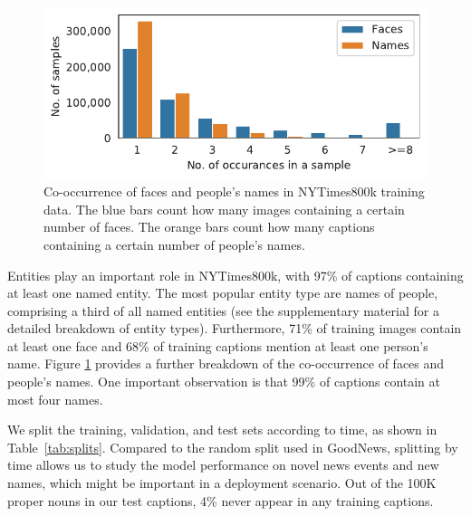 \begin{figure}[t]
   \begin{center}
   \includegraphics[width=0.99\linewidth]{figures/figure_3_faces.pdf}
   \end{center}
  \capmoveup
      \caption{Co-occurrence of faces and people's names in NYTimes800k
               training data. The blue bars count how many images containing a
               certain number of faces. The orange bars count how many captions
               containing a certain number of people's names.}
   \vspace{-3.5mm}
   \label{fig:faces}
\end{figure}





Entities play an important role in NYTimes800k, with 97\% of captions
containing at least one named entity. The most popular entity type are names of
people, comprising a third of all named entities (see the supplementary
material for a detailed breakdown of entity types). Furthermore, 71\% of
training images contain at least one face and 68\% of training captions mention
at least one person's name. Figure \ref{fig:faces} provides a further breakdown
of the co-occurrence of faces and people's names. One important observation is
that 99\% of captions contain at most four names.


We split the training, validation, and test sets according to time, as shown in
Table~\ref{tab:splits}. Compared to the random split used in GoodNews,
splitting by time allows us to study the model performance on novel news events
and new names, which might be important in a deployment scenario. Out of the
100K proper nouns in our test captions, 4\% never appear in any training
captions.
